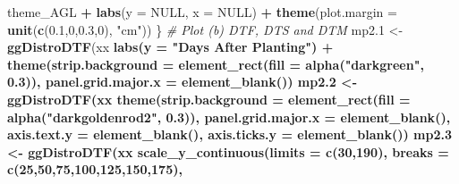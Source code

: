 \documentclass[
]{article}
\newenvironment{Shaded}{\begin{snugshade}}{\end{snugshade}}
\newcommand{\CommentTok}[1]{\textcolor[rgb]{0.56,0.35,0.01}{\textit{#1}}}
\newcommand{\DataTypeTok}[1]{\textcolor[rgb]{0.13,0.29,0.53}{#1}}
\newcommand{\DecValTok}[1]{\textcolor[rgb]{0.00,0.00,0.81}{#1}}
\newcommand{\FloatTok}[1]{\textcolor[rgb]{0.00,0.00,0.81}{#1}}
\newcommand{\KeywordTok}[1]{\textcolor[rgb]{0.13,0.29,0.53}{\textbf{#1}}}
\newcommand{\NormalTok}[1]{#1}
\newcommand{\OperatorTok}[1]{\textcolor[rgb]{0.81,0.36,0.00}{\textbf{#1}}}
\newcommand{\OtherTok}[1]{\textcolor[rgb]{0.56,0.35,0.01}{#1}}
\newcommand{\StringTok}[1]{\textcolor[rgb]{0.31,0.60,0.02}{#1}}
\begin{document}
\begin{Shaded}
\begin{Highlighting}[]
{{{{{{{{\StringTok{    }\NormalTok{theme_AGL }\OperatorTok{+}\StringTok{ }\KeywordTok{labs}\NormalTok{(}\DataTypeTok{y =} \OtherTok{NULL}\NormalTok{, }\DataTypeTok{x =} \OtherTok{NULL}\NormalTok{) }\OperatorTok{+}
\StringTok{    }\KeywordTok{theme}\NormalTok{(}\DataTypeTok{plot.margin =} \KeywordTok{unit}\NormalTok{(}\KeywordTok{c}\NormalTok{(}\FloatTok{0.1}\NormalTok{,}\DecValTok{0}\NormalTok{,}\FloatTok{0.3}\NormalTok{,}\DecValTok{0}\NormalTok{), }\StringTok{"cm"}\NormalTok{))}
\NormalTok{\}}
\CommentTok{# Plot (b) DTF, DTS and DTM}
\NormalTok{mp2}\FloatTok{.1}\NormalTok{ <-}\StringTok{ }\KeywordTok{ggDistroDTF}\NormalTok{(xx }\OperatorTok{%
\StringTok{  }\KeywordTok{labs}\NormalTok{(}\DataTypeTok{y =} \StringTok{"Days After Planting"}\NormalTok{) }\OperatorTok{+}\StringTok{ }
\StringTok{  }\KeywordTok{theme}\NormalTok{(}\DataTypeTok{strip.background =} \KeywordTok{element_rect}\NormalTok{(}\DataTypeTok{fill =} \KeywordTok{alpha}\NormalTok{(}\StringTok{"darkgreen"}\NormalTok{, }\FloatTok{0.3}\NormalTok{)),}
        \DataTypeTok{panel.grid.major.x =} \KeywordTok{element_blank}\NormalTok{())}
\NormalTok{mp2}\FloatTok{.2}\NormalTok{ <-}\StringTok{ }\KeywordTok{ggDistroDTF}\NormalTok{(xx }\OperatorTok{%
\StringTok{  }\KeywordTok{theme}\NormalTok{(}\DataTypeTok{strip.background =} \KeywordTok{element_rect}\NormalTok{(}\DataTypeTok{fill =} \KeywordTok{alpha}\NormalTok{(}\StringTok{"darkgoldenrod2"}\NormalTok{, }\FloatTok{0.3}\NormalTok{)),}
        \DataTypeTok{panel.grid.major.x =} \KeywordTok{element_blank}\NormalTok{(),}
        \DataTypeTok{axis.text.y =} \KeywordTok{element_blank}\NormalTok{(), }
        \DataTypeTok{axis.ticks.y =} \KeywordTok{element_blank}\NormalTok{())}
\NormalTok{mp2}\FloatTok{.3}\NormalTok{ <-}\StringTok{ }\KeywordTok{ggDistroDTF}\NormalTok{(xx }\OperatorTok{%
\StringTok{  }\KeywordTok{scale_y_continuous}\NormalTok{(}\DataTypeTok{limits =} \KeywordTok{c}\NormalTok{(}\DecValTok{30}\NormalTok{,}\DecValTok{190}\NormalTok{), }\DataTypeTok{breaks =} \KeywordTok{c}\NormalTok{(}\DecValTok{25}\NormalTok{,}\DecValTok{50}\NormalTok{,}\DecValTok{75}\NormalTok{,}\DecValTok{100}\NormalTok{,}\DecValTok{125}\NormalTok{,}\DecValTok{150}\NormalTok{,}\DecValTok{175}\NormalTok{),}
}}}}}}}}}}}
\end{Highlighting}
\end{Shaded}
\end{document}
